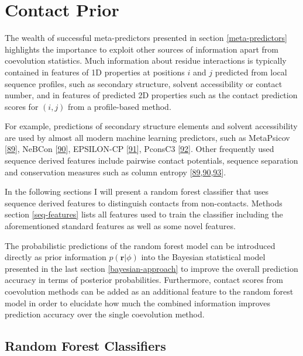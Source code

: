 \documentclass[12pt,a4paper,twoside]{book}
\renewcommand{\r}{\mathbf{r}}
\theoremstyle{definition}
\theoremstyle{definition}
\theoremstyle{remark}
\begin{document}
\chapter{Contact Prior}\label{contact-prior}

The wealth of successful meta-predictors presented in section
\ref{meta-predictors} highlights the importance to exploit other sources
of information apart from coevolution statistics. Much information about
residue interactions is typically contained in features of 1D properties
at positions \(i\) and \(j\) predicted from local sequence profiles,
such as secondary structure, solvent accessibility or contact number,
and in features of predicted 2D properties such as the contact
prediction scores for \((i,j)\) from a profile-based method.

For example, predictions of secondary structure elements and solvent
accessibility are used by almost all modern machine learning predictors,
such as MetaPsicov {[}\protect\hyperlink{ref-Jones2015a}{89}{]}, NeBCon
{[}\protect\hyperlink{ref-He2017}{90}{]}, EPSILON-CP
{[}\protect\hyperlink{ref-Stahl2017}{91}{]}, PconsC3
{[}\protect\hyperlink{ref-Skwark2016}{92}{]}. Other frequently used
sequence derived features include pairwise contact potentials, sequence
separation and conservation measures such as column entropy
{[}\protect\hyperlink{ref-Jones2015a}{89},\protect\hyperlink{ref-He2017}{90},\protect\hyperlink{ref-Ma2015a}{93}{]}.

In the following sections I will present a random forest classifier that
uses sequence derived features to distinguish contacts from
non-contacts. Methods section \ref{seq-features} lists all features used
to train the classifier including the aforementioned standard features
as well as some novel features.

The probabilistic predictions of the random forest model can be
introduced directly as prior information \(p(\r |\phi)\) into the
Bayesian statistical model presented in the last section
\ref{bayesian-approach} to improve the overall prediction accuracy in
terms of posterior probabilities. Furthermore, contact scores from
coevolution methods can be added as an additional feature to the random
forest model in order to elucidate how much the combined information
improves prediction accuracy over the single coevolution method.

\section{Random Forest Classifiers}\label{random-forest-classifiers}
\end{document}
